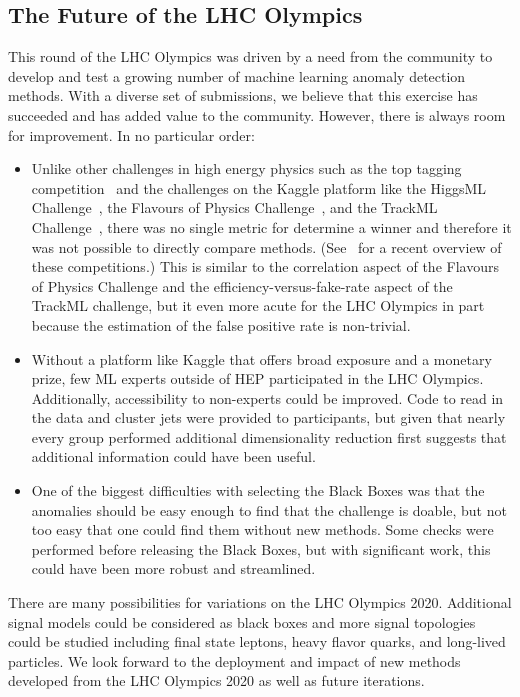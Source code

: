 \documentclass[a4paper,11pt]{article}
\begin{document}
\subsection{The Future of the LHC Olympics}

This round of the LHC Olympics was driven by a need from the community to develop and test a growing number of machine learning anomaly detection methods.  With a diverse set of submissions, we believe that this exercise has succeeded and has added value to the community.  However, there is always room for improvement.  In no particular order:

\begin{itemize}
    \item Unlike other challenges in high energy physics such as the top tagging competition~\cite{Kasieczka:2019dbj} and the challenges on the Kaggle platform like the HiggsML Challenge~\cite{pmlr-v42-cowa14}, the Flavours of Physics Challenge~\cite{flavorofphyiscs}, and the TrackML Challenge~\cite{Amrouche:2019wmx}, there was no single metric for determine a winner and therefore it was not possible to directly compare methods. (See~\cite{Rousseau:2020rnz} for a recent overview of these competitions.) This is similar to the correlation aspect of the Flavours of Physics Challenge and the efficiency-versus-fake-rate aspect of the TrackML challenge, but it even more acute for the LHC Olympics in part because the estimation of the false positive rate is non-trivial. 
    \item Without a platform like Kaggle that offers broad exposure and a monetary prize, few ML experts outside of HEP participated in the LHC Olympics.  Additionally, accessibility to non-experts could be improved.  Code to read in the data and cluster jets were provided to participants, but given that nearly every group performed additional dimensionality reduction first suggests that additional information could have been useful.
    \item One of the biggest difficulties with selecting the Black Boxes was that the anomalies should be easy enough to find that the challenge is doable, but not too easy that one could find them without new methods.  Some checks were performed before releasing the Black Boxes, but with significant work, this could have been more robust and streamlined.
\end{itemize}

There are many possibilities for variations on the LHC Olympics 2020.  Additional signal models could be considered as black boxes and more signal topologies could be studied including final state leptons, heavy flavor quarks, and long-lived particles.  We look forward to the deployment and impact of new methods developed from the LHC Olympics 2020 as well as future iterations.
\end{document}
